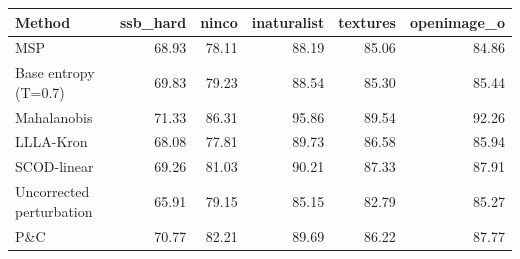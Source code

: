 \begin{tabular}{lrrrrr}
\toprule
Method & ssb\_hard & ninco & inaturalist & textures & openimage\_o \\
\midrule
MSP & 68.93 & 78.11 & 88.19 & 85.06 & 84.86 \\
Base entropy (T=0.7) & 69.83 & 79.23 & 88.54 & 85.30 & 85.44 \\
Mahalanobis & 71.33 & 86.31 & 95.86 & 89.54 & 92.26 \\
LLLA-Kron & 68.08 & 77.81 & 89.73 & 86.58 & 85.94 \\
SCOD-linear & 69.26 & 81.03 & 90.21 & 87.33 & 87.91 \\
Uncorrected perturbation & 65.91 & 79.15 & 85.15 & 82.79 & 85.27 \\
P\&C & 70.77 & 82.21 & 89.69 & 86.22 & 87.77 \\
\bottomrule
\end{tabular}
